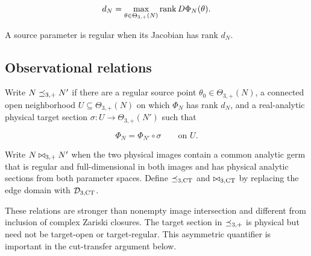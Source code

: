 \[
 d_N=\max_{\theta\in\Theta_{3,+}(N)}\operatorname{rank} D\Phi_N(\theta).
\]

A source parameter is regular when its Jacobian has rank \(d_N\).

\subsection{Observational relations}

\begin{definition}\label{def:relations}
Write \(N\preceq_{3,+} N'\) if there are a regular source point
\(\theta_0\in\Theta_{3,+}(N)\), a connected open neighborhood
\(U\subseteq\Theta_{3,+}(N)\) on which \(\Phi_N\) has rank \(d_N\), and a
real-analytic physical target section
\(\sigma:U\to\Theta_{3,+}(N')\) such that

\[
 \Phi_N=\Phi_{N'}\circ\sigma\qquad\text{on }U.
\]

Write \(N\mathbin{\bowtie}_{3,+} N'\) when the two physical images contain a common
analytic germ that is regular and full-dimensional in both images and has
physical analytic sections from both parameter spaces.  Define
\(\preceq_{3,\mathrm{CT}}\) and \(\mathbin{\bowtie}_{3,\mathrm{CT}}\) by replacing the edge domain with \(\mathcal D_{3,\mathrm{CT}}\).
\end{definition}

These relations are stronger than nonempty image intersection and different
from inclusion of complex Zariski closures.  The target section in
\(\preceq_{3,+}\) is physical but need not be target-open or target-regular.
This asymmetric quantifier is important in the cut-transfer argument below.
